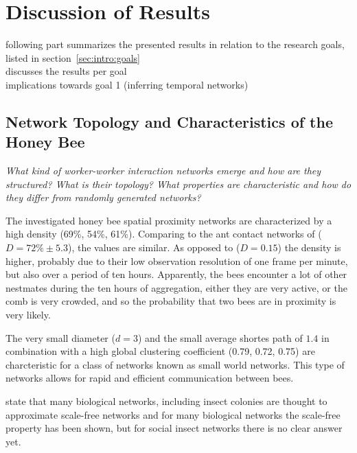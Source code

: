 \section{Discussion of Results}

following part summarizes the presented results in relation to the research goals, listed in section~\ref{sec:intro:goals}\\
discusses the results per goal\\
implications towards goal 1 (inferring temporal networks)\\


\subsection{Network Topology and Characteristics of the Honey Bee}
\emph{What kind of worker-worker interaction networks emerge and how are they structured?
What is their topology?
What properties are characteristic and how do they differ from randomly generated networks?}

The investigated honey bee spatial proximity networks are characterized by a high density (69\%, 54\%, 61\%).
Comparing to the ant contact networks of \textcite{mersch2013tracking} ($D=72\%\pm5.3$), the values are similar.
As opposed to \textcite{baracchi2014socio} ($D=0.15$) the density is higher, probably due to their low observation resolution of one frame per minute, but also over a period of ten hours.
Apparently, the bees encounter a lot of other nestmates during the ten hours of aggregation, either they are very active, or the comb is very crowded, and so the probability that two bees are in proximity is very likely.


The very small diameter ($d=3$) and the small average shortes path of $1.4$ in combination with a high global clustering coefficient (0.79, 0.72, 0.75) are charcteristic for a class of networks known as small world networks.
This type of networks allows for rapid and efficient communication between bees.


\textcite{charbonneau2013social} state that many biological networks, including insect colonies are thought to approximate scale-free networks and for many biological networks the scale-free property has been shown, but for social insect networks there is no clear answer yet.


